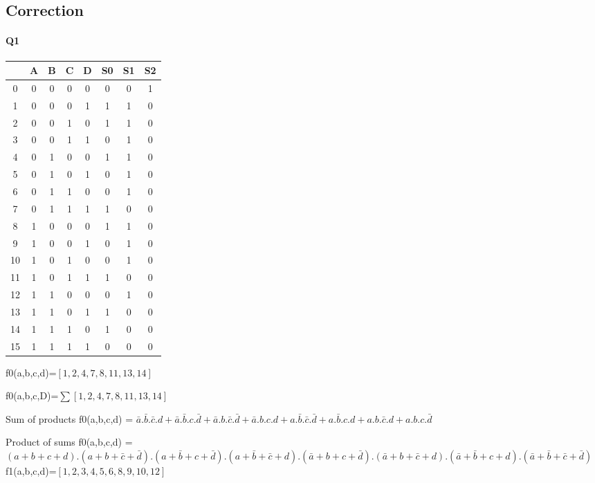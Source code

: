 \subsection{Correction}

\paragraph{Q1}

        \begin{tabular}{|c|c|c|c|c||c|c|c|}
    \toprule
         & A & B & C & D & S0 & S1 & S2\\ \midrule0 & 0 & 0 & 0 & 0 & 0 & 0 & 1\\1 & 0 & 0 & 0 & 1 & 1 & 1 & 0\\2 & 0 & 0 & 1 & 0 & 1 & 1 & 0\\3 & 0 & 0 & 1 & 1 & 0 & 1 & 0\\\midrule4 & 0 & 1 & 0 & 0 & 1 & 1 & 0\\5 & 0 & 1 & 0 & 1 & 0 & 1 & 0\\6 & 0 & 1 & 1 & 0 & 0 & 1 & 0\\7 & 0 & 1 & 1 & 1 & 1 & 0 & 0\\\midrule8 & 1 & 0 & 0 & 0 & 1 & 1 & 0\\9 & 1 & 0 & 0 & 1 & 0 & 1 & 0\\10 & 1 & 0 & 1 & 0 & 0 & 1 & 0\\11 & 1 & 0 & 1 & 1 & 1 & 0 & 0\\\midrule12 & 1 & 1 & 0 & 0 & 0 & 1 & 0\\13 & 1 & 1 & 0 & 1 & 1 & 0 & 0\\14 & 1 & 1 & 1 & 0 & 1 & 0 & 0\\15 & 1 & 1 & 1 & 1 & 0 & 0 & 0\\\bottomrule
        \end{tabular}
        f0(a,b,c,d)=$[1, 2, 4, 7, 8, 11, 13, 14]$

f0(a,b,c,D)=$ \sum [1, 2, 4, 7, 8, 11, 13, 14] $ 


Sum of products 
 f0(a,b,c,d) = $\bar a.\bar b.\bar c.d + \bar a.\bar b.c.\bar d + \bar a.b.\bar c.\bar d + \bar a.b.c.d + a.\bar b.\bar c.\bar d + a.\bar b.c.d + a.b.\bar c.d + a.b.c.\bar d$

Product of sums 
 f0(a,b,c,d) = $(a+b+c+d) . (a+b+\bar c+\bar d) . (a+\bar b+c+\bar d) . (a+\bar b+\bar c+d) . (\bar a+b+c+\bar d) . (\bar a+b+\bar c+d) . (\bar a+\bar b+c+d) . (\bar a+\bar b+\bar c+\bar d)$
f1(a,b,c,d)=$[1, 2, 3, 4, 5, 6, 8, 9, 10, 12]$

